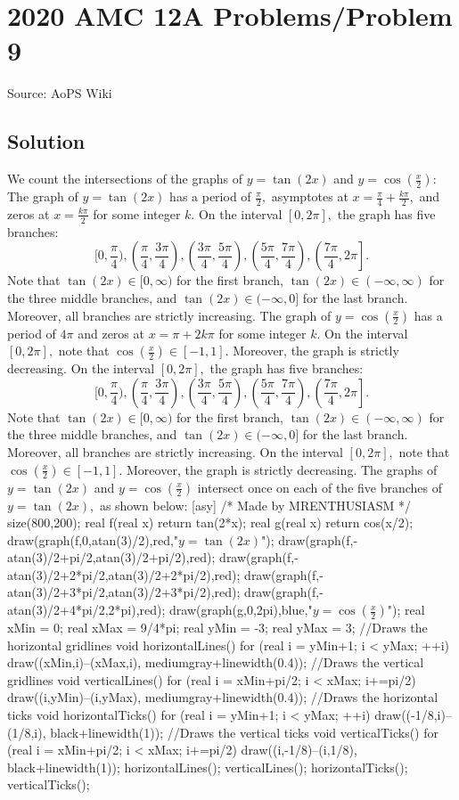 \documentclass[12pt]{article}
\begin{document}
\section*{{2020 AMC 12A Problems/Problem 9}}
Source: AoPS Wiki

\subsection*{Solution}
We count the intersections of the graphs of $y=\tan(2x)$ and $y=\cos\left(\frac x2\right):$ The graph of $y=\tan(2x)$ has a period of $\frac{\pi}{2},$ asymptotes at $x=\frac{\pi}{4}+\frac{k\pi}{2},$ and zeros at $x=\frac{k\pi}{2}$ for some integer $k.$ On the interval $[0,2\pi],$ the graph has five branches: \[\biggl[0,\frac{\pi}{4}\biggr),\left(\frac{\pi}{4},\frac{3\pi}{4}\right),\left(\frac{3\pi}{4},\frac{5\pi}{4}\right),\left(\frac{5\pi}{4},\frac{7\pi}{4}\right),\left(\frac{7\pi}{4},2\pi\right].\] Note that $\tan(2x)\in[0,\infty)$ for the first branch, $\tan(2x)\in(-\infty,\infty)$ for the three middle branches, and $\tan(2x)\in(-\infty,0]$ for the last branch. Moreover, all branches are strictly increasing. The graph of $y=\cos\left(\frac x2\right)$ has a period of $4\pi$ and zeros at $x=\pi+2k\pi$ for some integer $k.$ On the interval $[0,2\pi],$ note that $\cos\left(\frac x2\right)\in[-1,1].$ Moreover, the graph is strictly decreasing. On the interval $[0,2\pi],$ the graph has five branches: \[\biggl[0,\frac{\pi}{4}\biggr),\left(\frac{\pi}{4},\frac{3\pi}{4}\right),\left(\frac{3\pi}{4},\frac{5\pi}{4}\right),\left(\frac{5\pi}{4},\frac{7\pi}{4}\right),\left(\frac{7\pi}{4},2\pi\right].\] Note that $\tan(2x)\in[0,\infty)$ for the first branch, $\tan(2x)\in(-\infty,\infty)$ for the three middle branches, and $\tan(2x)\in(-\infty,0]$ for the last branch. Moreover, all branches are strictly increasing. On the interval $[0,2\pi],$ note that $\cos\left(\frac x2\right)\in[-1,1].$ Moreover, the graph is strictly decreasing. The graphs of $y=\tan(2x)$ and $y=\cos\left(\frac x2\right)$ intersect once on each of the five branches of $y=\tan(2x),$ as shown below: [asy] /* Made by MRENTHUSIASM */ size(800,200); real f(real x) { return tan(2*x); } real g(real x) { return cos(x/2); } draw(graph(f,0,atan(3)/2),red,"$y=\tan(2x)$"); draw(graph(f,-atan(3)/2+pi/2,atan(3)/2+pi/2),red); draw(graph(f,-atan(3)/2+2*pi/2,atan(3)/2+2*pi/2),red); draw(graph(f,-atan(3)/2+3*pi/2,atan(3)/2+3*pi/2),red); draw(graph(f,-atan(3)/2+4*pi/2,2*pi),red); draw(graph(g,0,2pi),blue,"$y=\cos\left(\frac x2\right)$"); real xMin = 0; real xMax = 9/4*pi; real yMin = -3; real yMax = 3; //Draws the horizontal gridlines void horizontalLines() { for (real i = yMin+1; i < yMax; ++i) { draw((xMin,i)--(xMax,i), mediumgray+linewidth(0.4)); } } //Draws the vertical gridlines void verticalLines() { for (real i = xMin+pi/2; i < xMax; i+=pi/2) { draw((i,yMin)--(i,yMax), mediumgray+linewidth(0.4)); } } //Draws the horizontal ticks void horizontalTicks() { for (real i = yMin+1; i < yMax; ++i) { draw((-1/8,i)--(1/8,i), black+linewidth(1)); } } //Draws the vertical ticks void verticalTicks() { for (real i = xMin+pi/2; i < xMax; i+=pi/2) { draw((i,-1/8)--(i,1/8), black+linewidth(1)); } } horizontalLines(); verticalLines(); horizontalTicks(); verticalTicks(); 
\end{document}
